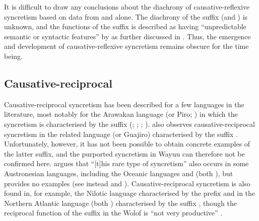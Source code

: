 It is difficult to draw any conclusions about the diachrony of causative-reflexive syncretism based on data from  and  alone. The diachrony of the  suffix  (and ) is  unknown, and the functions of the  suffix  is described as having “unpredictable semantic or syntactic features” by \citet[243]{dunn:1999} as further discussed in . Thus, the emergence and development of causative-reflexive syncretism remains obscure for the time being.

\subsection{Causative-reciprocal} \label{sec:simple-syncretism:caus-recp}
Causative-reciprocal syncretism has been described for a few languages in the literature, most notably for the Arawakan language  (or Piro; ) in which the syncretism is characterised by the suffix  (\citealt[38]{nedjalkov:silnickij:1969}; \citealt{kulikov:nedjalkov:1992}; \citealt[894]{kulikov:2001}; \citealt[292]{nedjalkov:2007d}). \citet[286]{nedjalkov:2007d} also observes causative-reciprocal syncretism in the related language  (or Guajiro) characterised by the suffix . Unfortunately, however, it has not been possible to obtain concrete examples of the latter suffix, and the purported syncretism in Wayuu can therefore not be confirmed here. \citet[894]{kulikov:2001} argues that “[t]his rare type of syncretism” also occurs in some Austronesian languages, including the Oceanic languages  and  (both ), but provides no examples (see instead \citealt[181f.]{johnston:1978} and \citealt[286]{nedjalkov:2007d}). Causative-reciprocal syncretism is also found in, for example, the Nilotic language  characterised by the prefix  \citep[285ff.]{nedjalkov:2007d} and in the Northern Atlantic language  (both ) characterised by the suffix , though the reciprocal function of the suffix  in the Wolof is “not very productive” \citep[298]{creissels:nouguier-voisin:2008}.

